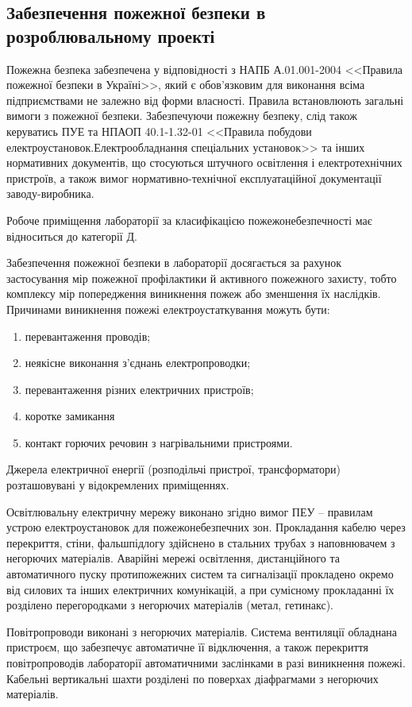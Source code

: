 \subsection{Забезпечення пожежної безпеки в розроблювальному проекті}
Пожежна безпека забезпечена у відповідності з НАПБ А.01.001-2004 <<Правила пожежної безпеки в Україні>>, який є обов'язковим для виконання всіма підприємствами не залежно від форми власності. Правила встановлюють загальні вимоги з пожежної безпеки. Забезпечуючи пожежну безпеку, слід також керуватись ПУЕ та НПАОП 40.1-1.32-01 <<Правила побудови електроустановок.Електрообладнання спеціальних установок>> та інших нормативних документів, що стосуються штучного освітлення і електротехнічних пристроїв, а також вимог нормативно-технічної експлуатаційної документації заводу-виробника.

Робоче приміщення лабораторії за класифікацією пожежонебезпечності має відноситься до категорії Д.

Забезпечення пожежної безпеки в лабораторії досягається за рахунок застосування мір пожежної профілактики 
й активного пожежного захисту, тобто комплексу мір попередження виникнення пожеж або зменшення їх наслідків. Причинами виникнення пожежі електроустаткування можуть бути:
\begin{enumerate}
 \item перевантаження проводів;
 \item неякісне виконання з'єднань електропроводки;
 \item перевантаження різних електричних пристроїв;
 \item коротке замикання
 \item контакт горючих речовин з нагрівальними пристроями.
\end{enumerate}

Джерела електричної енергії (розподільчі пристрої, трансформатори) розташовувані у відокремлених приміщеннях.

Освітлювальну електричну мережу виконано згідно вимог ПЕУ – правилам устрою електроустановок для пожежонебезпечних зон.
Прокладання кабелю через перекриття, стіни, фальшпідлогу здійснено в стальних трубах з наповнювачем з негорючих матеріалів. Аварійні мережі освітлення, дистанційного та автоматичного пуску протипожежних систем та сигналізації 
прокладено окремо від силових та інших електричних комунікацій, а при сумісному прокладанні їх 
розділено перегородками з негорючих матеріалів (метал, гетинакс).


Повітропроводи виконані з негорючих матеріалів. Система вентиляції обладнана пристроєм, що 
забезпечує автоматичне її відключення, а також перекриття повітропроводів лабораторії 
автоматичними заслінками в разі виникнення пожежі. Кабельні вертикальні шахти розділені 
по поверхах діафрагмами з негорючих матеріалів.

